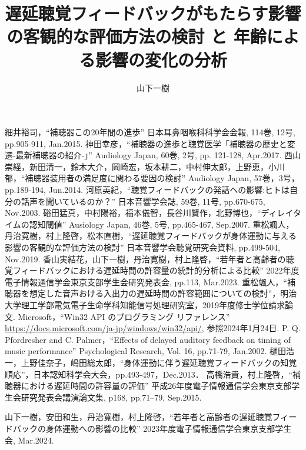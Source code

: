 \documentclass[a4paper,12pt]{jsreport}
\title{遅延聴覚フィードバックがもたらす影響の客観的な評価方法の検討
と
年齢による影響の変化の分析}
\author{山下\hspace{1zw}一樹}%
\begin{document}
\makecover%
\tableofcontents%










\begin{thebibliography}{99}
	細井裕司，``補聴器この20年間の進歩'' 日本耳鼻咽喉科科学会会報, 114巻, 12号, pp.905-911, Jan.2015.
  神田幸彦，``補聴器の進歩と聴覚医学「補聴器の歴史と変遷-最新補聴器の紹介-」'' Audiology Japan, 60巻, 2号, pp. 121-128, Apr.2017.
  西山崇経，新田清一，鈴木大介，岡崎宏，坂本耕二，中村伸太郎，上野恵，小川郁，``補聴器装用者の満足度に関わる要因の検討'' Audiology Japan, 57巻，3号，pp.189-194, Jun.2014.
  河原英紀，``聴覚フィードバックの発話への影響:ヒトは自分の話声を聞いているのか？'' 日本音響学会誌, 59巻, 11号, pp.670-675, Nov.2003.
  硲田猛真，中村陽裕，福本儀智，長谷川賢作，北野博也，``ディレイタイムの認知閾値'' Ausiology Japan, 46巻, 5号, pp.465-467, Sep.2007.
  重松颯人，丹治寛樹，村上隆啓，松本直樹，``遅延聴覚フィードバックが身体運動に与える影響の客観的な評価方法の検討'' 日本音響学会聴覚研究会資料, pp.499-504, Nov.2019.
  香山実結花，山下一樹，丹治寛樹，村上隆啓，``若年者と高齢者の聴覚フィードバックにおける遅延時間の許容量の統計的分析による比較'' 2022年度電子情報通信学会東京支部学生会研究発表会, pp.113, Mar.2023.
  重松颯人，``補聴器を想定した音声おける入出力の遅延時間の許容範囲についての検討''，明治大学理工学部電気電子生命学科知能信号処理研究室，2019年度修士学位請求論文.
  Microsoft，``Win32 API のプログラミング リファレンス'' \url{https://docs.microsoft.com/ja-jp/windows/win32/api/}, 参照2024年1月24日.
  P. Q. Pfordresher and C. Palmer，``Effects of delayed auditory feedback on timing of music performance'' Psychological Research, Vol. 16, pp.71-79, Jan.2002.
  樋田浩一，上野佳奈子，嶋田総太郎，``身体運動に伴う遅延聴覚フィードバックの知覚順応''，日本認知科学会大会，pp.493-497，Dec.2013．
  高橋浩貴，村上隆啓，``補聴器における遅延時間の許容量の評価'' 平成26年度電子情報通信学会東京支部学生会研究発表会講演論文集, p168, pp.71--79, Sep.2015.

\end{thebibliography}
\begin{thepublished}{99}
	山下一樹，安田和生，丹治寛樹，村上隆啓，``若年者と高齢者の遅延聴覚フィードバックの身体運動への影響の比較'' 2023年度電子情報通信学会東京支部学生会, Mar.2024.
	
\end{thepublished}
\newpage



\appendix

% 
% 

\end{document}

